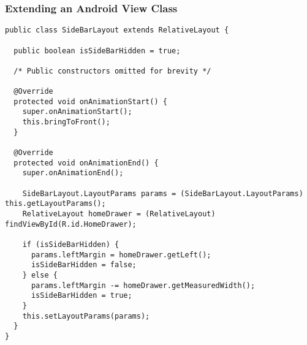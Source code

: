 \subsubsection{Extending an Android View Class}\label{sec:siebarlayout:java}


\begin{lstlisting}[caption={Extending the Android \lstinline|RelativeLayout| class.},label={lst:sidebarlayout:java}]
public class SideBarLayout extends RelativeLayout {
  
  public boolean isSideBarHidden = true;
  
  /* Public constructors omitted for brevity */
  
  @Override
  protected void onAnimationStart() {
    super.onAnimationStart();
    this.bringToFront();
  }
  
  @Override
  protected void onAnimationEnd() {
    super.onAnimationEnd();

    SideBarLayout.LayoutParams params = (SideBarLayout.LayoutParams) this.getLayoutParams();
    RelativeLayout homeDrawer = (RelativeLayout) findViewById(R.id.HomeDrawer);

    if (isSideBarHidden) {
      params.leftMargin = homeDrawer.getLeft();
      isSideBarHidden = false;
    } else {
      params.leftMargin -= homeDrawer.getMeasuredWidth();
      isSideBarHidden = true;
    }
    this.setLayoutParams(params);
  }
}
\end{lstlisting}
